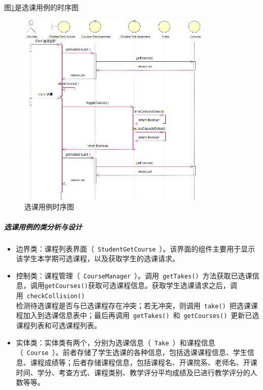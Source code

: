 图\ref{fig:selectcourse_secquence}是选课用例的时序图
\begin{figure}[htbp]
  \centering
  \includegraphics[width=0.82\textwidth]{img/selectcourse_secquence}
  \caption{选课用例时序图}
  \label{fig:selectcourse_secquence}
\end{figure}
    
\subparagraph{选课用例的类分析与设计}
\begin{itemize}
  \item 边界类：课程列表界面（~\texttt{StudentGetCourse}~）。该界面的组件主要用于显示该学生本学期可选课程，以及获取学生的选课请求。

  \item 控制类：课程管理（~\texttt{CourseManager}~）。调用~\texttt{getTakes()}~方法获取已选课信息，调用\texttt{getCourses()}获取可选课程信息。获取学生选课请求之后，调用~\texttt{checkCollision()}~\\检测待选课程是否与已选课程存在冲突；若无冲突，则调用~\texttt{take()}~把选课课程加入到选课信息表中；最后再调用~\texttt{getTakes()}~和~\texttt{getCourses()}~更新已选课程列表和可选课程列表。

  \item 实体类：实体类有两个，分别为选课信息（~\texttt{Take}~）和课程信息（~\texttt{Course}~）。前者存储了学生选课的各种信息，包括选课课程信息、学生信息、课程成绩等；后者存储课程信息，包括课程名、开课院系、老师名、开课时间、学分、考查方式、课程类别、教学评分平均成绩及已进行教学评分的人数等等。
\end{itemize}
    
